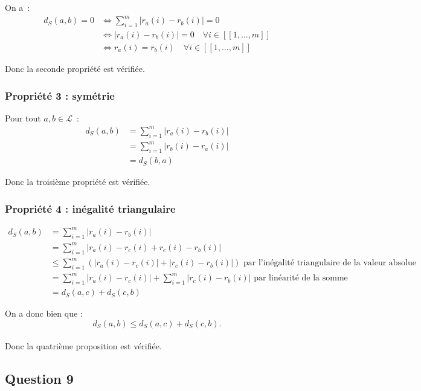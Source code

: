 \documentclass[11pt]{article}
\begin{document}
On a~:
\begin{align*}
d_S(a,b) = 0 
&\Leftrightarrow 
\sum_{i = 1}^m |r_a(i) - r_b(i)| = 0\\
&\Leftrightarrow 
|r_a(i) - r_b(i)| = 0 \quad \forall i \in [\![1, \ldots, m]\!]\\
&\Leftrightarrow 
r_a(i) = r_b(i) \quad \forall i \in [\![1, \ldots, m]\!]
\end{align*}


Donc la seconde propriété est vérifiée.


\subsubsection{Propriété 3 : symétrie}

Pour tout $a,b \in \mathcal{L}$~:
\begin{align*}
d_S(a,b) 
&= 
\sum_{i = 1}^m |r_a(i) - r_b(i)|\\
&= 
\sum_{i = 1}^m |r_b(i) - r_a(i)|\\
&= 
d_S(b,a) 
\end{align*}

Donc la troisième propriété est vérifiée.


\subsubsection{Propriété 4 : inégalité triangulaire}

\begin{align*}
d_S(a,b) 
&= \sum_{i=1}^m |r_a(i) - r_b(i)| \\
&= \sum_{i=1}^m |r_a(i) - r_c(i) + r_c(i) - r_b(i)| \\
&\leq \sum_{i=1}^m \left(|r_a(i) - r_c(i)| + |r_c(i) - r_b(i)|\right) \text{ par l'inégalité triangulaire de la valeur absolue}\\
&= \sum_{i=1}^m |r_a(i) - r_c(i)| + \sum_{i=1}^m |r_c(i) - r_b(i)| \text{ par linéarité de la somme} \\
&= d_S(a,c) + d_S(c,b)
\end{align*}

On a donc bien que :
\[
d_S(a,b) \leq d_S(a,c) + d_S(c,b).
\]
\\


Donc la quatrième proposition est vérifiée.


\subsection{Question 9}
\end{document}
